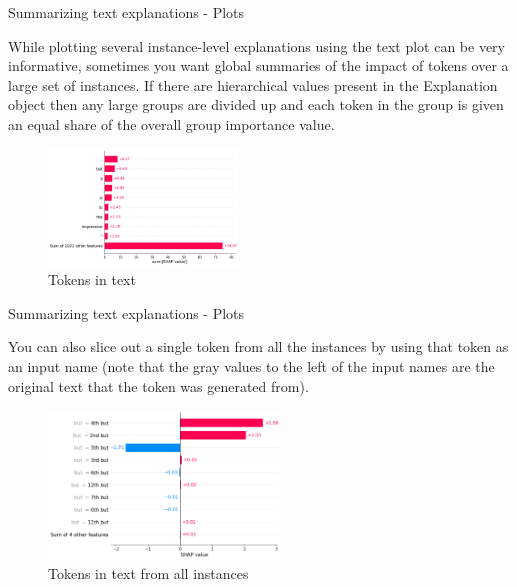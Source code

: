 \documentclass[aspectratio=169]{beamer}
\begin{document}
\begin{frame}{Summarizing text explanations - Plots}

While plotting several instance-level explanations using the text plot can be very informative, sometimes you want global summaries of the impact of tokens over a large set of instances. If there are hierarchical values present in the Explanation object then any large groups are divided up and each token in the group is given an equal share of the overall group importance value.

    \begin{figure}[htbp]
        \centering
        \includegraphics[width=0.45\textwidth]{figs/shap/plots/text/example_notebooks_api_examples_plots_text_7_0.png}
        \caption{Tokens in text}
        \label{fig:tokens-text}
    \end{figure}
\end{frame}

\begin{frame}{Summarizing text explanations - Plots}

You can also slice out a single token from all the instances by using that token as an input name (note that the gray values to the left of the input names are the original text that the token was generated from).

    \begin{figure}[htbp]
        \centering
        \includegraphics[width=0.55\textwidth]{figs/shap/plots/text/example_notebooks_api_examples_plots_text_11_0.png}
        \caption{Tokens in text from all instances}
        \label{fig:instances-tokens-text}
    \end{figure}
\end{frame}
\end{document}
